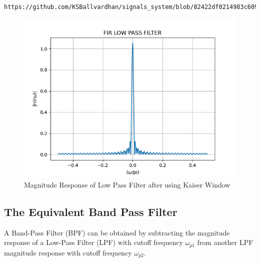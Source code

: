 \documentclass{article}
\begin{document}
	\begin{lstlisting}
		https://github.com/KSBallvardhan/signals_system/blob/82422df0214983c609a58248f2110732a1e57d72/filterDesign/codes/py7.py
	\end{lstlisting}
	\newpage
	\begin{figure}[htbp]
		\centering
		\includegraphics[width=1\linewidth]{figs/fig7}
		\caption{Magnitude Response of Low Pass Filter after using Kaiser Window}
		\label{fig:Kaiser_LPF_response}
	\end{figure}
	
	\subsection{The Equivalent Band Pass Filter}
	A Band-Pass Filter (BPF) can be obtained by subtracting the magnitude response of a Low-Pass Filter (LPF) with cutoff frequency $\omega_{p1}$ from another LPF magnitude response with cutoff frequency $\omega_{p2}$.
	
\end{document}
